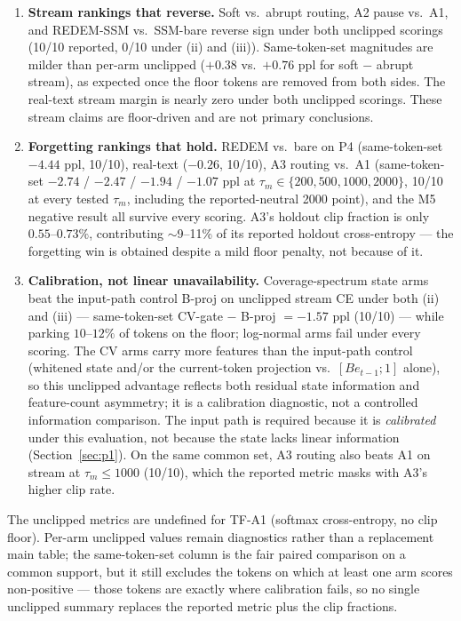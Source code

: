 \documentclass[preprint,12pt]{elsarticle}
\begin{document}
\begin{enumerate}
\item \textbf{Stream rankings that reverse.} Soft vs.\ abrupt routing,
  A2 pause vs.\ A1, and REDEM-SSM vs.\ SSM-bare reverse sign under both
  unclipped scorings (10/10 reported, 0/10 under (ii) and (iii)).
  Same-token-set magnitudes are milder than per-arm unclipped
  ($+0.38$ vs.\ $+0.76$ ppl for soft $-$ abrupt stream), as expected
  once the floor tokens are removed from both sides. The real-text
  stream margin is nearly zero under both unclipped scorings.
  These stream claims are floor-driven and are not primary conclusions.
\item \textbf{Forgetting rankings that hold.} REDEM vs.\ bare on
  P4 (same-token-set $-4.44$ ppl, 10/10), real-text ($-0.26$, 10/10),
  A3 routing vs.\ A1 (same-token-set $-2.74$ / $-2.47$ / $-1.94$ /
  $-1.07$ ppl at $\tau_m\in\{200,500,1000,2000\}$, 10/10 at every
  tested $\tau_m$, including the reported-neutral 2000 point), and the
  M5 negative result all survive every scoring.
  A3's holdout clip fraction is only
  $0.55$--$0.73\%$, contributing $\sim$9--11\% of its reported
  holdout cross-entropy --- the forgetting win is obtained despite a
  mild floor penalty, not because of it.
\item \textbf{Calibration, not linear unavailability.} Coverage-spectrum
  state arms beat the input-path control B-proj on unclipped stream CE
  under both (ii) and (iii) --- same-token-set CV-gate $-$ B-proj
  $=-1.57$ ppl (10/10) --- while parking
  $10$--$12\%$ of tokens on the floor; log-normal arms fail under every
  scoring. The CV arms carry more features than the input-path control
  (whitened state and/or the current-token projection vs.\ $[B e_{t-1};
  1]$ alone), so this unclipped advantage reflects both residual state
  information and feature-count asymmetry; it is a calibration
  diagnostic, not a controlled information comparison.
  The input path is required because it is \emph{calibrated}
  under this evaluation, not because the state lacks linear
  information (Section~\ref{sec:p1}). On the same common set, A3
  routing also beats A1 on stream at $\tau_m\le1000$ (10/10), which
  the reported metric masks with A3's higher clip rate.
\end{enumerate}

The unclipped metrics are undefined for TF-A1 (softmax cross-entropy,
no clip floor). Per-arm unclipped values remain diagnostics rather than
a replacement main table; the same-token-set column is the fair paired
comparison on a common support, but it still excludes the tokens on
which at least one arm scores non-positive --- those tokens are exactly
where calibration fails, so no single unclipped summary replaces the
reported metric plus the clip fractions.
\end{document}
